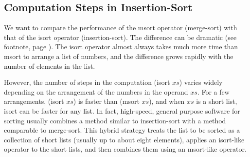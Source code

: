 \begin{exercises}




\end{exercises}

\subsection{Computation Steps in Insertion-Sort}
\label{subsec:isort-steps}

We want to compare the performance of
the \textsf{msort} operator (merge-sort)
with that of the \textsf{isort} operator (insertion-sort).
The difference can be dramatic
(see footnote, page \pageref{bubble-vs-quicksort-example}).
The \textsf{isort} operator almost always
takes much more time than \textsf{msort}
to arrange a list of numbers,
and the difference grows rapidly with the number of elements in the list.

However, the number of steps in the computation \textsf{(isort $xs$)}
varies widely depending on the arrangement of the numbers in the operand $xs$.
For a few arrangements,
\textsf{(isort $xs$)} is faster than \textsf{(msort $xs$)},
and when $xs$ is a short list, \textsf{isort} can be faster for any list.
In fact, high-speed, general purpose software for sorting
usually combines a method similar to insertion-sort
with a method comparable to merge-sort.
This hybrid strategy treats
the list to be sorted as a collection of short lists
(usually up to about eight elements),
applies an \textsf{isort}-like operator to the short lists,
and then combines them
using an \textsf{msort}-like operator.

